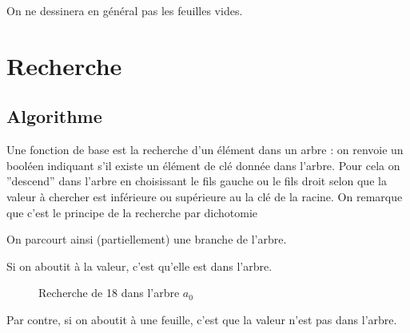 On ne dessinera en général pas les feuilles vides.
\section{Recherche}
\subsection{Algorithme}
Une fonction de base est la recherche d'un élément dans un arbre : on renvoie un booléen indiquant s'il existe un élément de clé donnée dans l'arbre. Pour cela on ''descend'' dans l'arbre en choisissant le fils gauche ou le fils droit selon que la valeur à chercher est inférieure ou supérieure au la clé de la racine. On remarque que c'est le principe de la recherche par dichotomie

On parcourt ainsi (partiellement) une branche de l'arbre.

\medskip

Si on aboutit à la valeur, c'est qu'elle est dans l'arbre. 

\begin{figure*}[h]
\centering
{}
\caption{Recherche de 18 dans l'arbre $a_0$}
\end{figure*}

Par contre, si on aboutit à une feuille, c'est que la valeur n'est pas dans l'arbre. 

